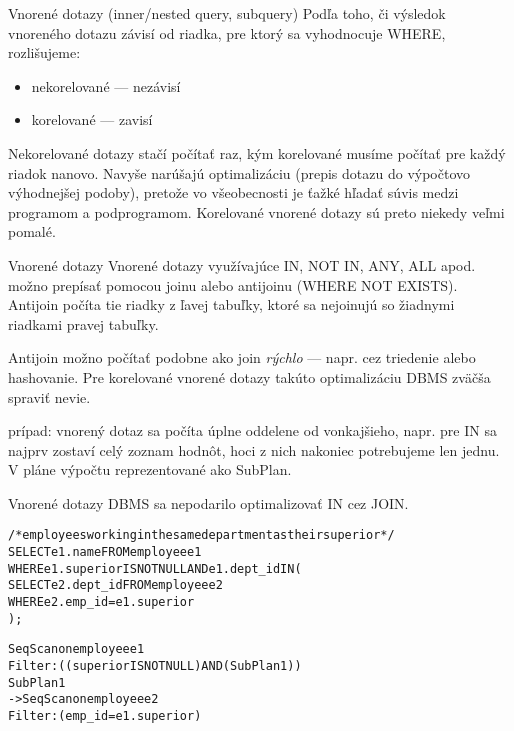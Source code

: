 \documentclass[12pt]{beamer}
\begin{document}
\begin{frame}[fragile]{Vnorené dotazy (inner/nested query, subquery)}
Podľa toho, či výsledok vnoreného dotazu závisí od riadka, pre ktorý sa vyhodnocuje WHERE, rozlišujeme:
\begin{itemize}
\item \alert{nekorelované} --- nezávisí
\item \alert{korelované} --- zavisí
\end{itemize}
Nekorelované dotazy stačí počítať raz, kým korelované musíme počítať pre každý riadok nanovo.
Navyše narúšajú optimalizáciu (prepis dotazu do výpočtovo výhodnejšej podoby),
pretože vo všeobecnosti je ťažké hľadať súvis medzi programom a podprogramom.
Korelované vnorené dotazy sú preto niekedy veľmi pomalé.
\end{frame}

\begin{frame}[fragile]{Vnorené dotazy}
Vnorené dotazy využívajúce IN, NOT IN, ANY, ALL apod. možno prepísať pomocou joinu alebo \alert{antijoinu} (WHERE NOT EXISTS).
Antijoin počíta tie riadky z ľavej tabuľky, ktoré sa nejoinujú so žiadnymi riadkami pravej tabuľky.
\bigskip

Antijoin možno počítať podobne ako join \emph{rýchlo} --- napr. cez triedenie alebo hashovanie.
Pre korelované vnorené dotazy takúto optimalizáciu DBMS zväčša spraviť nevie.
\bigskip

 prípad: vnorený dotaz sa počíta úplne oddelene od vonkajšieho,
napr. pre IN sa najprv zostaví celý zoznam hodnôt, hoci z nich nakoniec potrebujeme len jednu.
V pláne výpočtu reprezentované ako \alert{SubPlan}.
\end{frame}

\begin{frame}[fragile]{Vnorené dotazy}
DBMS sa \alert{nepodarilo} optimalizovať IN cez JOIN.
\medskip

\begin{scriptsize}
\begin{alltt}
/* employees working in the same department as their superior */
SELECT e1.name FROM employee e1
WHERE e1.superior IS NOT NULL AND e1.dept_id IN (
    SELECT e2.dept_id FROM employee e2
    WHERE e2.emp_id = e1.superior
);
\end{alltt}
\end{scriptsize}
\smallskip
\begin{small}
\begin{alltt}
Seq Scan on employee e1
  Filter: ((superior IS NOT NULL) AND (SubPlan 1))
  \alert{SubPlan} 1
    ->  Seq Scan on employee e2
        Filter: (emp_id = e1.superior)


\end{alltt}
\end{small}
\end{frame}
\end{document}

